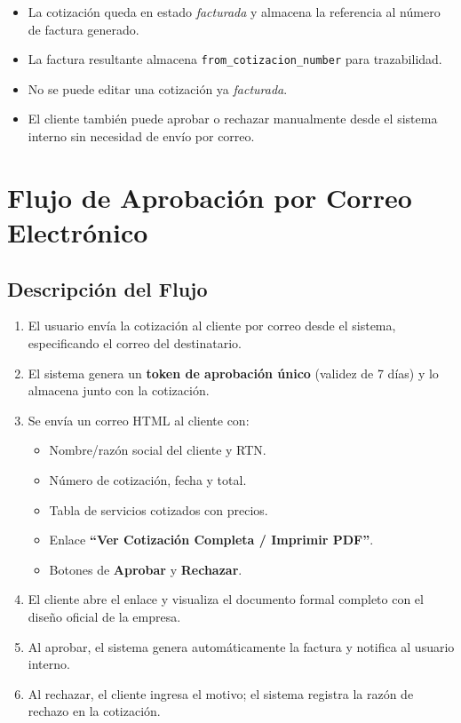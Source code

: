 \documentclass[12pt, letterpaper]{article}
\begin{document}
\begin{itemize}
  \item La cotización queda en estado \textit{facturada} y almacena la
        referencia al número de factura generado.
  \item La factura resultante almacena \texttt{from\_cotizacion\_number}
        para trazabilidad.
  \item No se puede editar una cotización ya \textit{facturada}.
  \item El cliente también puede aprobar o rechazar manualmente desde
        el sistema interno sin necesidad de envío por correo.
\end{itemize}

\section{Flujo de Aprobación por Correo Electrónico}

\subsection{Descripción del Flujo}

\begin{enumerate}[label=\textbf{\arabic*.}]
  \item El usuario envía la cotización al cliente por correo desde el
        sistema, especificando el correo del destinatario.
  \item El sistema genera un \textbf{token de aprobación único} (validez
        de 7 días) y lo almacena junto con la cotización.
  \item Se envía un correo HTML al cliente con:
    \begin{itemize}
      \item Nombre/razón social del cliente y RTN.
      \item Número de cotización, fecha y total.
      \item Tabla de servicios cotizados con precios.
      \item Enlace \textbf{``Ver Cotización Completa / Imprimir PDF''}.
      \item Botones de \textbf{Aprobar} y \textbf{Rechazar}.
    \end{itemize}
  \item El cliente abre el enlace y visualiza el documento formal completo
        con el diseño oficial de la empresa.
  \item Al aprobar, el sistema genera automáticamente la factura y notifica
        al usuario interno.
  \item Al rechazar, el cliente ingresa el motivo; el sistema registra la
        razón de rechazo en la cotización.
\end{enumerate}
\end{document}
